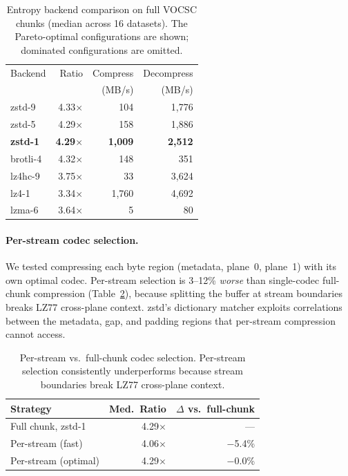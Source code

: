 \documentclass[10pt,twocolumn,letterpaper]{article}
\begin{document}
\begin{table}[h]
\centering
\caption{Entropy backend comparison on full VOCSC chunks (median across 16 datasets). The Pareto-optimal configurations are shown; dominated configurations are omitted.}
\label{tab:codec_shootout}
\footnotesize
\begin{tabular}{lrrr}
\toprule
Backend & Ratio & Compress & Decompress \\
 & & (MB/s) & (MB/s) \\
\midrule
zstd-9       & 4.33$\times$ &    104 & 1{,}776 \\
zstd-5       & 4.29$\times$ &    158 & 1{,}886 \\
\textbf{zstd-1} & \textbf{4.29}$\times$ & \textbf{1{,}009} & \textbf{2{,}512} \\
brotli-4     & 4.32$\times$ &    148 &    351 \\
lz4hc-9      & 3.75$\times$ &     33 & 3{,}624 \\
lz4-1        & 3.34$\times$ & 1{,}760 & 4{,}692 \\
lzma-6       & 3.64$\times$ &      5 &     80 \\
\bottomrule
\end{tabular}
\end{table}

\paragraph{Per-stream codec selection.}
We tested compressing each byte region (metadata, plane~0, plane~1) with its own optimal codec.
Per-stream selection is 3--12\% \emph{worse} than single-codec full-chunk compression (Table~\ref{tab:perstream}), because splitting the buffer at stream boundaries breaks LZ77 cross-plane context.
zstd's dictionary matcher exploits correlations between the metadata, gap, and padding regions that per-stream compression cannot access.

\begin{table}[h]
\centering
\caption{Per-stream vs.\ full-chunk codec selection. Per-stream selection consistently underperforms because stream boundaries break LZ77 cross-plane context.}
\label{tab:perstream}
\footnotesize
\begin{tabular}{lrr}
\toprule
Strategy & Med.\ Ratio & $\Delta$ vs.\ full-chunk \\
\midrule
Full chunk, zstd-1       & 4.29$\times$ & --- \\
Per-stream (fast)        & 4.06$\times$ & $-$5.4\% \\
Per-stream (optimal)     & 4.29$\times$ & $-$0.0\% \\
\bottomrule
\end{tabular}
\end{table}
\end{document}
